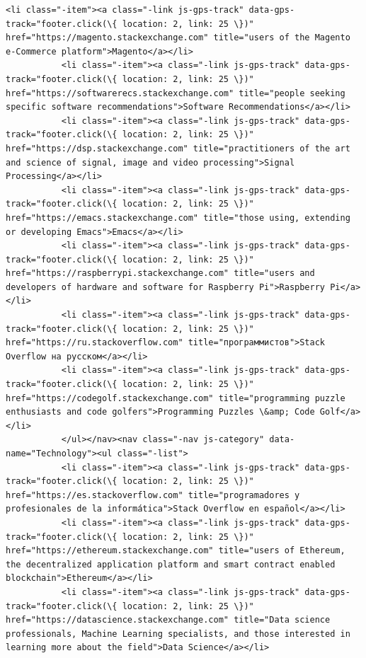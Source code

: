 \documentclass[11pt]{article}
\begin{document}
\begin{Verbatim}[commandchars=\\\{\}]
           <li class="-item"><a class="-link js-gps-track" data-gps-track="footer.click(\{ location: 2, link: 25 \})" href="https://magento.stackexchange.com" title="users of the Magento e-Commerce platform">Magento</a></li>
           <li class="-item"><a class="-link js-gps-track" data-gps-track="footer.click(\{ location: 2, link: 25 \})" href="https://softwarerecs.stackexchange.com" title="people seeking specific software recommendations">Software Recommendations</a></li>
           <li class="-item"><a class="-link js-gps-track" data-gps-track="footer.click(\{ location: 2, link: 25 \})" href="https://dsp.stackexchange.com" title="practitioners of the art and science of signal, image and video processing">Signal Processing</a></li>
           <li class="-item"><a class="-link js-gps-track" data-gps-track="footer.click(\{ location: 2, link: 25 \})" href="https://emacs.stackexchange.com" title="those using, extending or developing Emacs">Emacs</a></li>
           <li class="-item"><a class="-link js-gps-track" data-gps-track="footer.click(\{ location: 2, link: 25 \})" href="https://raspberrypi.stackexchange.com" title="users and developers of hardware and software for Raspberry Pi">Raspberry Pi</a></li>
           <li class="-item"><a class="-link js-gps-track" data-gps-track="footer.click(\{ location: 2, link: 25 \})" href="https://ru.stackoverflow.com" title="программистов">Stack Overflow на русском</a></li>
           <li class="-item"><a class="-link js-gps-track" data-gps-track="footer.click(\{ location: 2, link: 25 \})" href="https://codegolf.stackexchange.com" title="programming puzzle enthusiasts and code golfers">Programming Puzzles \&amp; Code Golf</a></li>
           </ul></nav><nav class="-nav js-category" data-name="Technology"><ul class="-list">
           <li class="-item"><a class="-link js-gps-track" data-gps-track="footer.click(\{ location: 2, link: 25 \})" href="https://es.stackoverflow.com" title="programadores y profesionales de la informática">Stack Overflow en español</a></li>
           <li class="-item"><a class="-link js-gps-track" data-gps-track="footer.click(\{ location: 2, link: 25 \})" href="https://ethereum.stackexchange.com" title="users of Ethereum, the decentralized application platform and smart contract enabled blockchain">Ethereum</a></li>
           <li class="-item"><a class="-link js-gps-track" data-gps-track="footer.click(\{ location: 2, link: 25 \})" href="https://datascience.stackexchange.com" title="Data science professionals, Machine Learning specialists, and those interested in learning more about the field">Data Science</a></li>

\end{Verbatim}
\end{document}
